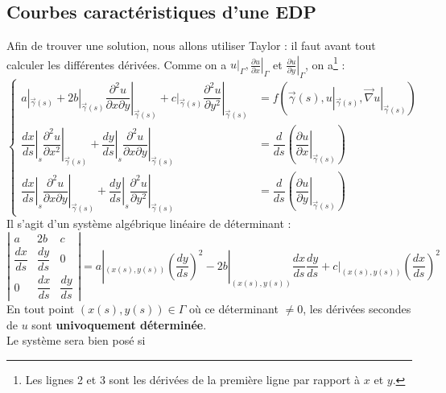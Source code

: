 \documentclass[british,french,11pt, a4paper, openany]{book}
\begin{document}
			\subsection{Courbes caractéristiques d'une EDP}
			Afin de trouver une solution, nous allons utiliser Taylor : il faut avant tout calculer les différentes dérivées. Comme on a $u|_\Gamma, \left.\frac{\partial u}{\partial x}\right|_\Gamma$ et $\left.\frac{\partial u}{\partial y}\right|_\Gamma$, on a\footnote{Les lignes 2 et 3 sont les dérivées de la première ligne par rapport à $x$ et $y$.} :
			\begin{equation}
				\left\{\begin{array}{ll}
				a|_{\vec{\gamma}(s)} + 2b|_{\vec{\gamma}(s)}\left.\dfrac{\partial^2 u}{\partial x \partial y}\right|_{\vec{\gamma}(s)} + c|_{\vec{\gamma}(s)}\left.\dfrac{\partial^2u}{\partial y^2}\right|_{\vec{\gamma}(s)} &= f(\vec{\gamma}(s), u|_{\vec{\gamma}(s)}, \vec \nabla u|_{\vec{\gamma}(s)})\\
				\left.\dfrac{dx}{ds}\right|_{s}\left.\dfrac{\partial^2u}{\partial x^2}\right|_{\vec{\gamma}(s)} + \left.\dfrac{dy}{ds}\right|_{s}\left.\dfrac{\partial^2u}{\partial x\partial y}\right|_{\vec{\gamma}(s)} &= \dfrac{d}{ds}\left(\left.\dfrac{\partial u}{\partial x}\right|_{\vec{\gamma}(s)}\right)\\
				\left.\dfrac{dx}{ds}\right|_{s}\left.\dfrac{\partial^2u}{\partial x\partial y}\right|_{\vec{\gamma}(s)} + \left.\dfrac{dy}{ds}\right|_{s}\left.\dfrac{\partial^2u}{\partial y^2}\right|_{\vec{\gamma}(s)} &= \dfrac{d}{ds}\left(\left.\dfrac{\partial u}{\partial y}\right|_{\vec{\gamma}(s)}\right)
				\end{array}\right.
			\end{equation}
			Il s'agit d'un système algébrique linéaire de déterminant  :
			\begin{equation}
				\left|\begin{array}{ccc}
				a & 2b & c\\
				\dfrac{dx}{ds} & \dfrac{dy}{ds} & 0\\
				0 & \dfrac{dx}{ds} & \dfrac{dy}{ds}
				\end{array}\right| = a|_{(x(s),y(s))} \left(\dfrac{dy}{ds}\right)^2 - 2b|_{(x(s),y(s))} \dfrac{dx}{ds}\dfrac{dy}{ds} + c|_{(x(s),y(s))}\left(\dfrac{dx}{ds}\right)^2
			\end{equation}
			En tout point $(x(s),y(s)) \in \Gamma$ où ce déterminant $\neq 0$, les dérivées secondes de $u$ sont \textbf{univoquement déterminée}.\\
			Le système sera bien posé si
\end{document}

